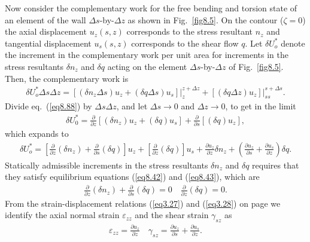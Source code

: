 \documentclass{AeroStructure-ERJohnson}
\begin{document}
\vspace*{-1pc}

Now consider the complementary work for the free bending and
torsion state of an element of the wall $\Delta s$-by-$\Delta z$
as shown in Fig.~\ref{fig8.5}. On the contour ($\zeta=0$) the
axial displacement $u_{z}(s, z)$ corresponds to the stress
resultant $n_z$ and tangential displacement $u_{s}(s, z)$
corresponds to the shear flow $q$. Let $\delta U_{o}^{*}$ denote
the increment in the complementary work per unit area for
increments in the stress resultants $\delta n_z$ and $\delta q$
acting on the element $\Delta s$-by-$\Delta z$ of
Fig.~\ref{fig8.5}. Then, the complementary work is
\begin{align}\label{eq8.88}
\delta U_{o}^{*} \Delta s \Delta z=\left.\left[\left(\delta n_{z}
\Delta s\right) u_{z}+(\delta q \Delta s) u_{s}\right]\right|_{z}
^{z+\Delta z}+\left.\left[(\delta q \Delta z)
u_{z}\right]\right|_{s s} ^{s+\Delta s}.
\end{align}
Divide eq.~(\ref{eq8.88}) by $\Delta s \Delta z$, and let $\Delta
s \rightarrow 0$ and $\Delta z \rightarrow 0$, to get in the limit
\begin{align}\label{eq8.89}
\delta U_{0}^{*}=\frac{\partial}{\partial z}\left[\left(\delta
n_{z}\right) u_{z}+(\delta q)
u_{s}\right]+\frac{\partial}{\partial s}\left[(\delta q)
u_{z}\right],
\end{align}
which expands to
\begin{align}\label{eq8.90}
\delta U_{o}^{*}=\left[\frac{\partial}{\partial z}\left(\delta
n_{z}\right)+\frac{\partial}{\partial s}(\delta q)\right]
u_{z}+\left[\frac{\partial}{\partial z}(\delta q)\right]
u_{s}+\frac{\partial u_{z}}{\partial z} \delta
n_{z}+\left(\frac{\partial u_{z}}{\partial s}+\frac{\partial
u_{s}}{\partial z}\right) \delta q.
\end{align}
Statically admissible increments in the stress resultants $\delta
n_z$ and $\delta q$ requires that they satisfy equilibrium
equations (\ref{eq8.42}) and (\ref{eq8.43}), which are
\begin{align}\label{eq8.91}
\frac{\partial}{\partial z}\left(\delta
n_{z}\right)+\frac{\partial}{\partial s}(\delta q)=0 \quad
\frac{\partial}{\partial z}(\delta q)=0.
\end{align}
From the strain-displacement relations (\ref{eq3.27}) and
(\ref{eq3.28}) on page \pageref{eq3.28} we identify the axial
normal strain $\varepsilon_{z z}$ and the shear strain $\gamma_{s
z}$ as
\begin{align}\label{eq8.92}
\varepsilon_{z z}=\frac{\partial u_{z}}{\partial z} \quad
\gamma_{s z}=\frac{\partial u_{z}}{\partial s}+\frac{\partial
u_{s}}{\partial z}.
\end{align}
\end{document}
